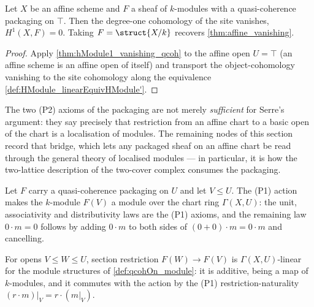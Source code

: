 \begin{theorem}
  \label{thm:hModule_vanishing_qcoh}
  \leanok
  Let \(X\) be an affine scheme and \(F\) a sheaf of \(k\)-modules with a quasi-coherence
  packaging on \(\top\). Then the degree-one cohomology of the site vanishes,
  \(H^1(X, F) = 0\). Taking \(F = \struct{X/k}\) recovers \ref{thm:affine_vanishing}.
\end{theorem}
\begin{proof}
  \leanok
  Apply \ref{thm:hModule1_vanishing_qcoh} to the affine open \(U = \top\) (an affine scheme is an
  affine open of itself) and transport the object-cohomology vanishing to the site cohomology
  along the equivalence \ref{def:HModule_linearEquivHModule'}.
\end{proof}

The two (P2) axioms of the packaging are not merely \emph{sufficient} for Serre's argument:
they say precisely that restriction from an affine chart to a basic open of the chart is a
localisation of modules. The remaining nodes of this section record that bridge, which lets
any packaged sheaf on an affine chart be read through the general theory of localised
modules --- in particular, it is how the two-lattice description of the two-cover complex
consumes the packaging.

\begin{definition}
  \label{def:qcohOn_module}
  \leanok
  Let \(F\) carry a quasi-coherence packaging on \(U\) and let \(V \le U\). The (P1) action
  makes the \(k\)-module \(F(V)\) a module over the chart ring \(\Gamma(X, U)\): the unit,
  associativity and distributivity laws are the (P1) axioms, and the remaining law
  \(0 \cdot m = 0\) follows by adding \(0 \cdot m\) to both sides of
  \((0 + 0) \cdot m = 0 \cdot m\) and cancelling.
\end{definition}

\begin{definition}
  \label{def:qcohOn_secRes_linear}
  \leanok
  For opens \(V \le W \le U\), section restriction \(F(W) \to F(V)\) is
  \(\Gamma(X, U)\)-linear for the module structures of \ref{def:qcohOn_module}: it is
  additive, being a map of \(k\)-modules, and it commutes with the action by the (P1)
  restriction-naturality \((r \cdot m)|_V = r \cdot (m|_V)\).
\end{definition}

